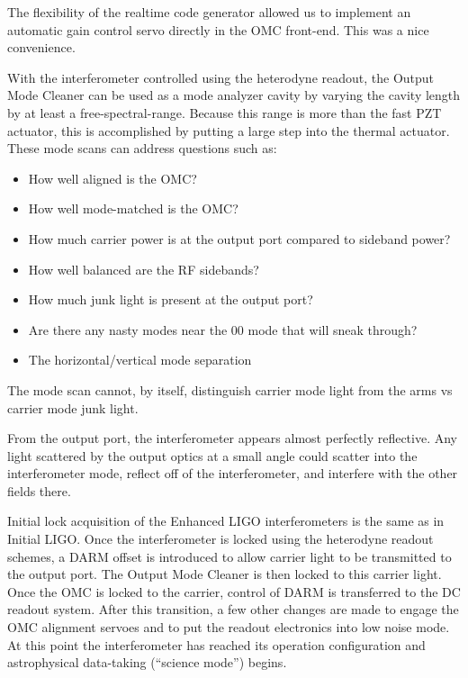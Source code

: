 The flexibility of the realtime code generator allowed us to implement
an automatic gain control servo directly in the OMC front-end.  This
was a nice convenience. 




With the interferometer controlled using the heterodyne readout, the
Output Mode Cleaner can be used as a mode analyzer cavity by varying
the cavity length by at least a free-spectral-range. Because this
range is more than the fast PZT actuator, this is accomplished by
putting a large step into the thermal actuator. These mode scans can
address questions such as:
\begin{itemize}
\item How well aligned is the OMC?
\item How well mode-matched is the OMC?
\item How much carrier power is at the output port compared to sideband
power?
\item How well balanced are the RF sidebands?
\item How much junk light is present at the output port?
\item Are there any nasty modes near the 00 mode that will sneak through?
\item The horizontal/vertical mode separation
\end{itemize}
The mode scan cannot, by itself, distinguish carrier mode light from
the arms vs carrier mode junk light.



From the output port, the interferometer appears almost perfectly
reflective.  Any light scattered by the output optics at a small angle
could scatter into the interferometer mode, reflect off of the
interferometer, and interfere with the other fields there.



Initial lock acquisition of the Enhanced LIGO interferometers is the
same as in Initial LIGO. Once the interferometer is locked using the
heterodyne readout schemes, a DARM offset is introduced to allow carrier
light to be transmitted to the output port. The Output Mode Cleaner
is then locked to this carrier light. Once the OMC is locked to the
carrier, control of DARM is transferred to the DC readout system.
After this transition, a few other changes are made to engage the
OMC alignment servoes and to put the readout electronics into low
noise mode. At this point the interferometer has reached its operation
configuration and astrophysical data-taking ({}``science mode'')
begins.


